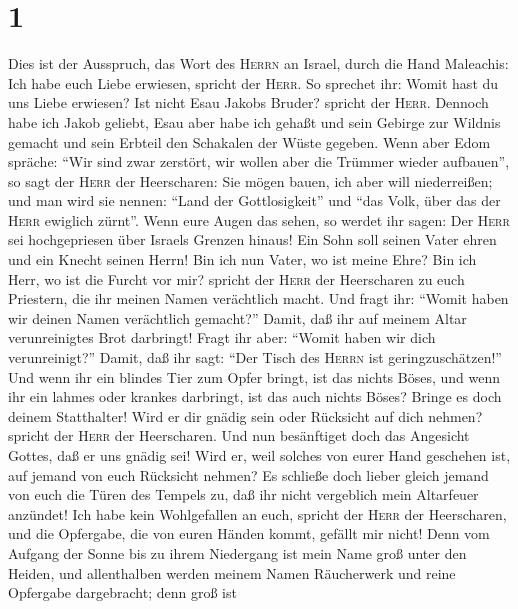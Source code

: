 \hypertarget{section}{%
\section{1}\label{section}}

 Dies ist der Ausspruch, das Wort des \textsc{Herrn} an
Israel, durch die Hand Maleachis:  Ich habe euch Liebe
erwiesen, spricht der \textsc{Herr}. So sprechet ihr: Womit hast du uns
Liebe erwiesen?  Ist nicht Esau Jakobs Bruder? spricht der
\textsc{Herr}. Dennoch habe ich Jakob geliebt, Esau aber habe ich gehaßt
und sein Gebirge zur Wildnis gemacht und sein Erbteil den Schakalen der
Wüste gegeben.  Wenn aber Edom spräche: ``Wir sind zwar
zerstört, wir wollen aber die Trümmer wieder aufbauen'', so sagt der
\textsc{Herr} der Heerscharen: Sie mögen bauen, ich aber will
niederreißen; und man wird sie nennen: ``Land der Gottlosigkeit'' und
``das Volk, über das der \textsc{Herr} ewiglich zürnt''. 
Wenn eure Augen das sehen, so werdet ihr sagen: Der \textsc{Herr} sei
hochgepriesen über Israels Grenzen hinaus!  Ein Sohn soll
seinen Vater ehren und ein Knecht seinen Herrn! Bin ich nun Vater, wo
ist meine Ehre? Bin ich Herr, wo ist die Furcht vor mir? spricht der
\textsc{Herr} der Heerscharen zu euch Priestern, die ihr meinen Namen
verächtlich macht.  Und fragt ihr: ``Womit haben wir
deinen Namen verächtlich gemacht?'' Damit, daß ihr auf meinem Altar
verunreinigtes Brot darbringt! Fragt ihr aber: ``Womit haben wir dich
verunreinigt?'' Damit, daß ihr sagt: ``Der Tisch des \textsc{Herrn} ist
geringzuschätzen!''  Und wenn ihr ein blindes Tier zum
Opfer bringt, ist das nichts Böses, und wenn ihr ein lahmes oder krankes
darbringt, ist das auch nichts Böses? Bringe es doch deinem Statthalter!
Wird er dir gnädig sein oder Rücksicht auf dich nehmen? spricht der
\textsc{Herr} der Heerscharen.  Und nun besänftiget doch
das Angesicht Gottes, daß er uns gnädig sei! Wird er, weil solches von
eurer Hand geschehen ist, auf jemand von euch Rücksicht nehmen?
 Es schließe doch lieber gleich jemand von euch die Türen
des Tempels zu, daß ihr nicht vergeblich mein Altarfeuer anzündet! Ich
habe kein Wohlgefallen an euch, spricht der \textsc{Herr} der
Heerscharen, und die Opfergabe, die von euren Händen kommt, gefällt mir
nicht!  Denn vom Aufgang der Sonne bis zu ihrem
Niedergang ist mein Name groß unter den Heiden, und allenthalben werden
meinem Namen Räucherwerk und reine Opfergabe dargebracht; denn groß ist
